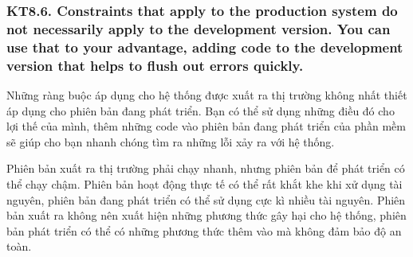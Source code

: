 \documentclass[12pt]{report}
\begin{document}
\subsubsection{KT8.6. Constraints that apply to the production system do not necessarily apply to the development version. You can use that to your advantage, adding code to the development version that helps to flush out errors quickly.}
Những ràng buộc áp dụng cho hệ thống được xuất ra thị trường không nhất thiết áp dụng cho phiên bản đang phát triển. Bạn có thể sử dụng những điều đó cho lợi thế của mình, thêm những code vào phiên bản đang phát triển của phần mềm sẽ giúp cho bạn nhanh chóng tìm ra những lỗi xảy ra với hệ thống. 
\vspace*{3mm}

Phiên bản xuất ra thị trường phải chạy nhanh, nhưng phiên bản để phát triển có thể chạy chậm. Phiên bản hoạt động thực tế có thể rất khắt khe khi xử dụng tài nguyên, phiên bản đang phát triển có thể sử dụng cực kì nhiều tài nguyên. Phiên bản xuất ra không nên xuất hiện những phương thức gây hại cho hệ thống, phiên bản phát triển có thể có những phương thức thêm vào mà không đảm bảo độ an toàn. 
\end{document}
